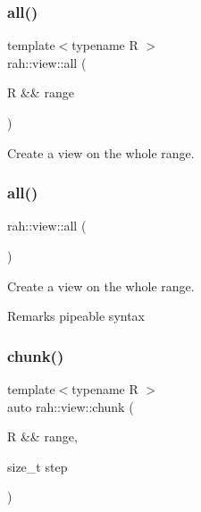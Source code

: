 \subsubsection{\texorpdfstring{all()}{all()}\hspace{0.1cm}{\footnotesize\ttfamily [1/2]}}
{\footnotesize\ttfamily template$<$typename R $>$ \\
rah\+::view\+::all (\begin{DoxyParamCaption}\item[{R \&\&}]{range }\end{DoxyParamCaption})}



Create a view on the whole range. 

\mbox{\label{namespacerah_1_1view_addec9cf697ca9378bb7b68ad732d9a0d}} 
\subsubsection{\texorpdfstring{all()}{all()}\hspace{0.1cm}{\footnotesize\ttfamily [2/2]}}
{\footnotesize\ttfamily rah\+::view\+::all (\begin{DoxyParamCaption}{ }\end{DoxyParamCaption})}



Create a view on the whole range. 

\begin{DoxyRemark}{Remarks}
pipeable syntax 
\end{DoxyRemark}
\mbox{\label{namespacerah_1_1view_aa4ea72dd93cb1d17db2f4755bdee0cef}} 
\subsubsection{\texorpdfstring{chunk()}{chunk()}\hspace{0.1cm}{\footnotesize\ttfamily [1/2]}}
{\footnotesize\ttfamily template$<$typename R $>$ \\
auto rah\+::view\+::chunk (\begin{DoxyParamCaption}\item[{R \&\&}]{range,  }\item[{size\+\_\+t}]{step }\end{DoxyParamCaption})}

